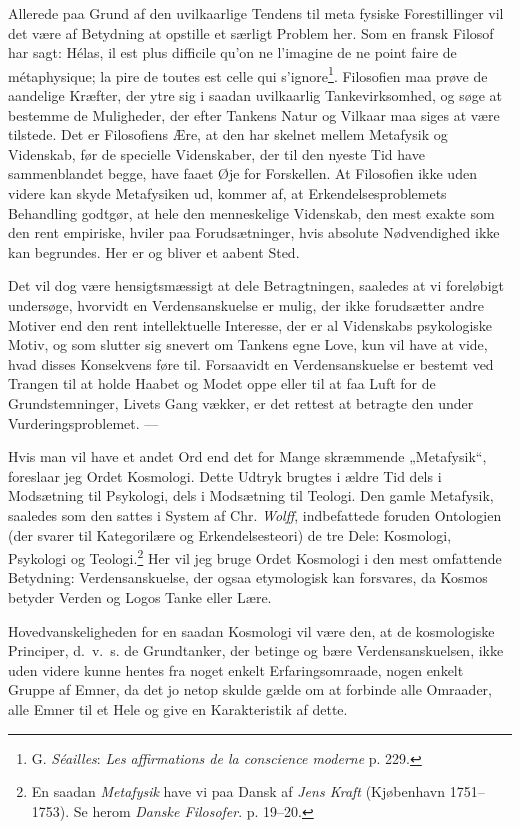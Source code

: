 \documentclass[12pt,a4paper]{book}
\newcommand{\opage}[1]{\marginnote{\footnotesize\textit{[#1]}}}
\newcommand{\apage}[1]{\marginnote{\footnotesize\textit{[#1]}}}
\begin{document}
Allerede paa Grund af den uvilkaarlige Tendens til meta%
\opage{308}fysiske Forestillinger vil det
være af Betydning at opstille et særligt Problem her. Som en fransk Filosof har sagt:
Hélas, il est plus difficile qu'on ne l'imagine de ne point faire de métaphysique; la
pire de toutes est celle qui s'ignore\footnote{G. \emph{Séailles}: \emph{Les
affirmations de la conscience moderne} p. 229.}. Filosofien maa prøve de aandelige
Kræfter, der ytre sig i saadan uvilkaarlig Tankevirksomhed, og søge at bestemme de
Muligheder, der efter Tankens Natur og Vilkaar maa siges at være tilstede. Det er
Filosofiens Ære, at den har skelnet mellem Metafysik og Videnskab, før de specielle
Videnskaber, der til den nyeste Tid have sammenblandet begge, have faaet Øje for
Forskellen. At Filosofien ikke uden videre kan skyde Metafysiken ud, kommer af, at
Erkendelsesproblemets Behandling godtgør, at hele den menneskelige Videnskab, den mest
exakte som den rent empiriske, hviler paa Forudsætninger, hvis absolute Nødvendighed
ikke kan begrundes. Her er og bliver et aabent Sted.

Det vil dog være hensigtsmæssigt at dele Betragtningen, saaledes at vi foreløbigt
undersøge, hvorvidt en Verdensanskuelse er mulig, der ikke forudsætter andre Motiver
end den rent intellektuelle Interesse, der er al Videnskabs psykologiske Motiv, og som
slutter sig snevert om Tankens egne Love, kun vil have at vide, hvad disses Konsekvens
føre til. Forsaavidt en Verdensanskuelse er bestemt ved Trangen til at holde Haabet og
Modet oppe eller til at faa Luft for de Grundstemninger, Livets Gang vækker, er det
rettest at betragte den under Vurderingsproblemet. ---

Hvis man vil have et andet Ord end det for Mange skræmmende „Metafysik“, foreslaar jeg
Ordet Kosmologi. Dette Udtryk brugtes i ældre Tid dels i Modsætning til Psykologi, dels
i Modsætning til Teologi. Den gamle Metafysik, saaledes som den sattes i System af
Chr. \emph{Wolff}, indbefattede foruden Ontologien (der svarer til Kategorilære og
Erkendelsesteori) de tre Dele: Kosmologi, Psykologi og Teologi.\footnote{En saadan
\emph{Metafysik} have vi paa Dansk af \emph{Jens Kraft} (Kjøbenhavn 1751--1753). Se
herom \emph{Danske Filosofer}. p. 19--20.} Her vil jeg bruge Ordet Kosmologi i den
mest omfattende Betydning: Verdensanskuelse, der ogsaa \apage{309} etymologisk kan forsvares, da
Kosmos betyder Verden og Logos Tanke eller Lære.

Hovedvanskeligheden for en saadan Kosmologi vil være den, at de kosmologiske
Principer, d.\ v.\ s. de Grundtanker, der betinge og bære Verdensanskuelsen, ikke uden
videre kunne hentes fra noget enkelt Erfaringsomraade, nogen enkelt Gruppe af Emner,
da det jo netop skulde gælde om at forbinde alle Omraader, alle Emner til et Hele og
give en Karakteristik af dette.
\end{document}
